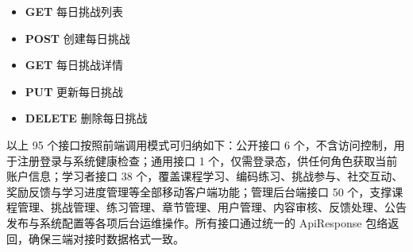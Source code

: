 \begin{appendices}
\begin{itemize}
  \item \textbf{GET}  \hfill 每日挑战列表
  \item \textbf{POST}  \hfill 创建每日挑战
  \item \textbf{GET}  \hfill 每日挑战详情
  \item \textbf{PUT}  \hfill 更新每日挑战
  \item \textbf{DELETE}  \hfill 删除每日挑战
\end{itemize}

\noindent 以上 95 个接口按照前端调用模式可归纳如下：公开接口 6 个，不含访问控制，用于注册登录与系统健康检查；通用接口 1 个，仅需登录态，供任何角色获取当前账户信息；学习者接口 38 个，覆盖课程学习、编码练习、挑战参与、社交互动、奖励反馈与学习进度管理等全部移动客户端功能；管理后台端接口 50 个，支撑课程管理、挑战管理、练习管理、章节管理、用户管理、内容审核、反馈处理、公告发布与系统配置等各项后台运维操作。所有接口通过统一的 ApiResponse 包络返回，确保三端对接时数据格式一致。

\end{appendices}
